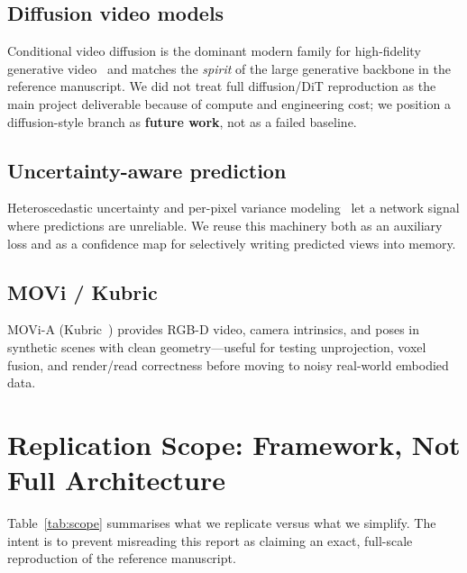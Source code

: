 \documentclass[11pt]{article}
\begin{document}
\subsection{Diffusion video models}
Conditional video diffusion is the dominant modern family for high-fidelity generative
video~\cite{videodiffusion} and matches the \emph{spirit} of the large generative backbone in the reference
manuscript. We did not treat full diffusion/DiT reproduction as the main project deliverable because of
compute and engineering cost; we position a diffusion-style branch as \textbf{future work}, not as a failed
baseline.

\subsection{Uncertainty-aware prediction}
Heteroscedastic uncertainty and per-pixel variance modeling~\cite{kendallgal2017} let a network signal
where predictions are unreliable. We reuse this machinery both as an auxiliary loss and as a confidence map
for selectively writing predicted views into memory.

\subsection{MOVi / Kubric}
MOVi-A (Kubric~\cite{kubric}) provides RGB-D video, camera intrinsics, and poses in synthetic scenes with
clean geometry---useful for testing unprojection, voxel fusion, and render/read correctness before moving
to noisy real-world embodied data.

\section{Replication Scope: Framework, Not Full Architecture}
\label{sec:replication-scope}

Table~\ref{tab:scope} summarises what we replicate versus what we simplify. The intent is to prevent
misreading this report as claiming an exact, full-scale reproduction of the reference manuscript.
\end{document}
